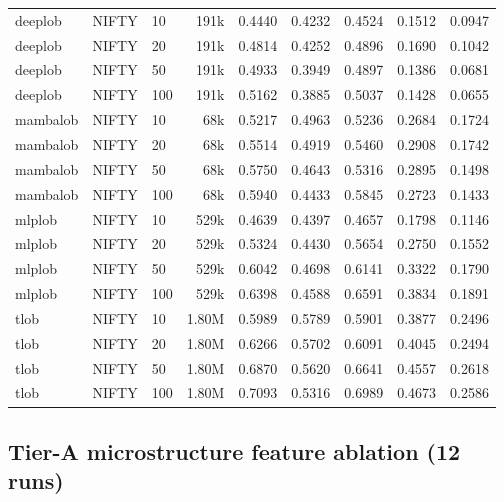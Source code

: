 {\begin{longtable}{@{}lllrrrrrr@{}}
deeplob & NIFTY & 10 & 191k & 0.4440 & 0.4232 & 0.4524 & 0.1512 & 0.0947 \\
deeplob & NIFTY & 20 & 191k & 0.4814 & 0.4252 & 0.4896 & 0.1690 & 0.1042 \\
deeplob & NIFTY & 50 & 191k & 0.4933 & 0.3949 & 0.4897 & 0.1386 & 0.0681 \\
deeplob & NIFTY & 100 & 191k & 0.5162 & 0.3885 & 0.5037 & 0.1428 & 0.0655 \\
mambalob & NIFTY & 10 & 68k & 0.5217 & 0.4963 & 0.5236 & 0.2684 & 0.1724 \\
mambalob & NIFTY & 20 & 68k & 0.5514 & 0.4919 & 0.5460 & 0.2908 & 0.1742 \\
mambalob & NIFTY & 50 & 68k & 0.5750 & 0.4643 & 0.5316 & 0.2895 & 0.1498 \\
mambalob & NIFTY & 100 & 68k & 0.5940 & 0.4433 & 0.5845 & 0.2723 & 0.1433 \\
mlplob & NIFTY & 10 & 529k & 0.4639 & 0.4397 & 0.4657 & 0.1798 & 0.1146 \\
mlplob & NIFTY & 20 & 529k & 0.5324 & 0.4430 & 0.5654 & 0.2750 & 0.1552 \\
mlplob & NIFTY & 50 & 529k & 0.6042 & 0.4698 & 0.6141 & 0.3322 & 0.1790 \\
mlplob & NIFTY & 100 & 529k & 0.6398 & 0.4588 & 0.6591 & 0.3834 & 0.1891 \\
tlob & NIFTY & 10 & 1.80M & 0.5989 & 0.5789 & 0.5901 & 0.3877 & 0.2496 \\
tlob & NIFTY & 20 & 1.80M & 0.6266 & 0.5702 & 0.6091 & 0.4045 & 0.2494 \\
tlob & NIFTY & 50 & 1.80M & 0.6870 & 0.5620 & 0.6641 & 0.4557 & 0.2618 \\
tlob & NIFTY & 100 & 1.80M & 0.7093 & 0.5316 & 0.6989 & 0.4673 & 0.2586 \\
\end{longtable}

\subsection{Tier-A microstructure feature ablation (12 runs)}

}
